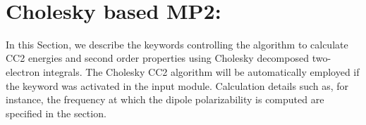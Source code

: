 ~%
\section{Cholesky based MP2: }
\label{sec:chomp2}

In this Section, we describe the keywords controlling the algorithm to 
calculate CC2 energies and  second order properties using Cholesky 
decomposed two-electron integrals. The Cholesky CC2 algorithm will be
automatically employed if the keyword  was activated in the
 input module.  Calculation details such as, for instance, the
frequency at which the dipole polarizability is computed are specified
in the  section.


\begin{center}
\end{center}

